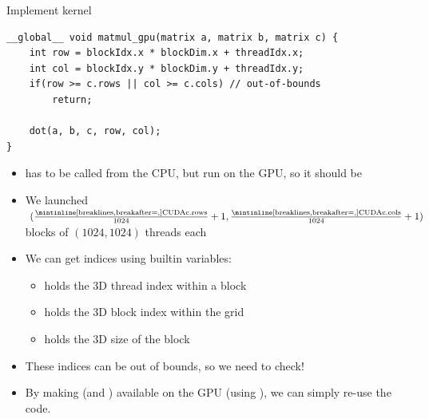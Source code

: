 \begin{frame}[fragile]{Implement kernel}
    \begin{verbatim}
__global__ void matmul_gpu(matrix a, matrix b, matrix c) {
    int row = blockIdx.x * blockDim.x + threadIdx.x;
    int col = blockIdx.y * blockDim.y + threadIdx.y;
    if(row >= c.rows || col >= c.cols) // out-of-bounds
        return;

    dot(a, b, c, row, col);
}
    \end{verbatim}
    \begin{itemize}
        \item<only@1>  has to be called from the CPU, but run on the GPU, so it should be 
        \item<only@2> We launched $(\frac{\text{\CUDA{c.rows}}}{1024} + 1, \frac{\text{\CUDA{c.cols}}}{1024} + 1)$ blocks of $(1024, 1024)$ threads each
        \item<only@2> We can get indices using builtin variables:
        \begin{itemize}
            \item<only@2>  holds the 3D thread index within a block
            \item<only@2>  holds the 3D block index within the grid
            \item<only@2>  holds the 3D size of the block
        \end{itemize}
        \item<only@2> These indices can be out of bounds, so we need to check!
        \item<only@3> By making  (and ) available on the GPU (using ), we can simply re-use the code.
    \end{itemize}
\end{frame}

